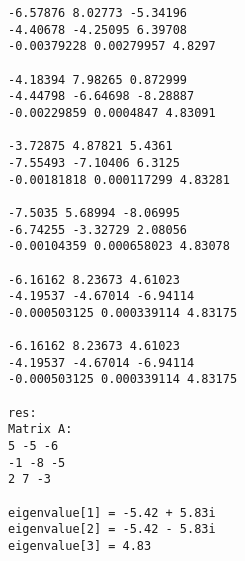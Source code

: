 \begin{verbatim}
-6.57876 8.02773 -5.34196 
-4.40678 -4.25095 6.39708 
-0.00379228 0.00279957 4.8297 

-4.18394 7.98265 0.872999 
-4.44798 -6.64698 -8.28887 
-0.00229859 0.0004847 4.83091 

-3.72875 4.87821 5.4361 
-7.55493 -7.10406 6.3125 
-0.00181818 0.000117299 4.83281 

-7.5035 5.68994 -8.06995 
-6.74255 -3.32729 2.08056 
-0.00104359 0.000658023 4.83078 

-6.16162 8.23673 4.61023 
-4.19537 -4.67014 -6.94114 
-0.000503125 0.000339114 4.83175 

-6.16162 8.23673 4.61023 
-4.19537 -4.67014 -6.94114 
-0.000503125 0.000339114 4.83175 

res:
Matrix A:
5 -5 -6 
-1 -8 -5 
2 7 -3 

eigenvalue[1] = -5.42 + 5.83i
eigenvalue[2] = -5.42 - 5.83i
eigenvalue[3] = 4.83
\end{verbatim}

\pagebreak

